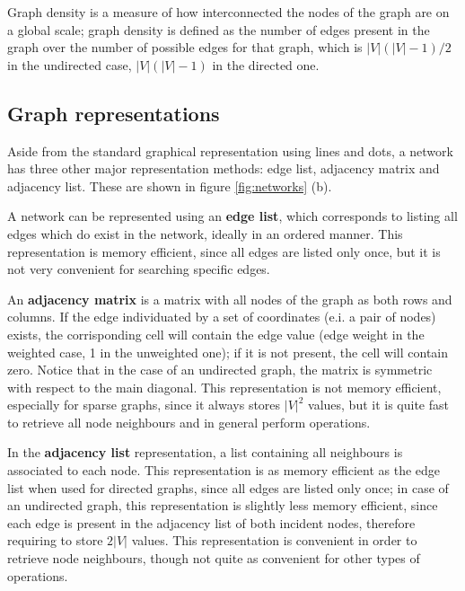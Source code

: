 Graph density is a measure of how interconnected the nodes of the graph are on a global scale; graph density is defined as the number of edges present in the graph over the number of possible edges for that graph, which is $|V|(|V|-1)/2$ in the undirected case, $|V|(|V|-1)$ in the directed one. 

\subsection{Graph representations} 

Aside from the standard graphical representation using lines and dots, a network has three other major representation methods: edge list, adjacency matrix and adjacency list. These are shown in figure \ref{fig:networks} (b).

A network can be represented using an \textbf{edge list}, which corresponds to listing all edges which do exist in the network, ideally in an ordered manner. This representation is memory efficient, since all edges are listed only once, but it is not very convenient for searching specific edges.

An \textbf{adjacency matrix} is a matrix with all nodes of the graph as both rows and columns. If the edge individuated by a set of coordinates (e.i. a pair of nodes) exists, the corrisponding cell will contain the edge value (edge weight in the weighted case, 1 in the unweighted one); if it is not present, the cell will contain zero. Notice that in the case of an undirected graph, the matrix is symmetric with respect to the main diagonal. This representation is not memory efficient, especially for sparse graphs, since it always stores $|V|^2$ values, but it is quite fast to retrieve all node neighbours and in general perform operations. 

In the \textbf{adjacency list} representation, a list containing all neighbours is associated to each node. This representation is as memory efficient as the edge list when used for directed graphs, since all edges are listed only once; in case of an undirected graph, this representation is slightly less memory efficient, since each edge is present in the adjacency list of both incident nodes, therefore requiring to store $2|V|$ values. This representation is convenient in order to retrieve node neighbours, though not quite as convenient for other types of operations. 

